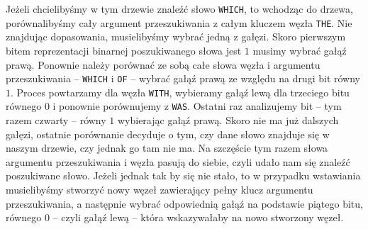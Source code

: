 \begin{figure}[htb]
	\end{figure}
	\newpage
    Jeżeli chcielibyśmy w tym drzewie znaleźć słowo \texttt{WHICH}, to wchodząc do drzewa, porównalibyśmy cały argument przeszukiwania z całym kluczem węzła \texttt{THE}. Nie znajdując dopasowania, musielibyśmy wybrać jedną z gałęzi. Skoro pierwszym bitem reprezentacji binarnej poszukiwanego słowa jest $1$ musimy wybrać gałąź prawą. Ponownie należy porównać ze sobą całe słowa węzła i argumentu przeszukiwania -- \texttt{WHICH} i \texttt{OF} -- wybrać gałąź prawą ze względu na drugi bit równy $1$. Proces powtarzamy dla węzła \texttt{WITH}, wybieramy gałąź lewą dla trzeciego bitu równego $0$ i ponownie porównujemy z \texttt{WAS}. Ostatni raz analizujemy bit -- tym razem czwarty -- równy $1$ wybierając gałąź prawą. Skoro nie ma już dalszych gałęzi, ostatnie porównanie decyduje o tym, czy dane słowo znajduje się w naszym drzewie, czy jednak go tam nie ma. Na szczęście tym razem słowa argumentu przeszukiwania i węzła pasują do siebie, czyli udało nam się znaleźć poszukiwane słowo. Jeżeli jednak tak by się nie stało, to w przypadku wstawiania musielibyśmy stworzyć nowy węzeł zawierający pełny klucz argumentu przeszukiwania, a następnie wybrać odpowiednią gałąź na podstawie piątego bitu, równego $0$ -- czyli gałąź lewą -- która wskazywałaby na nowo stworzony węzeł.\newline
	
